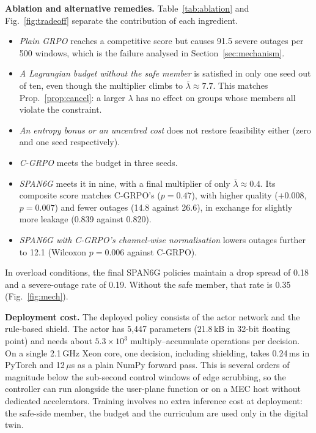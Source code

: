 \documentclass[conference]{IEEEtran}
\begin{document}
\textbf{Ablation and alternative remedies.} Table~\ref{tab:ablation} and Fig.~\ref{fig:tradeoff} separate the contribution of each ingredient.
\begin{itemize}
\item \emph{Plain GRPO} reaches a competitive score but causes 91.5 severe outages per 500 windows, which is the failure analysed in Section~\ref{sec:mechanism}.
\item \emph{A Lagrangian budget without the safe member} is satisfied in only one seed out of ten, even though the multiplier climbs to $\bar\lambda\approx7.7$. This matches Prop.~\ref{prop:cancel}: a larger $\lambda$ has no effect on groups whose members all violate the constraint.
\item \emph{An entropy bonus or an uncentred cost} does not restore feasibility either (zero and one seed respectively).
\item \emph{C-GRPO} meets the budget in three seeds.
\item \emph{SPAN6G} meets it in nine, with a final multiplier of only $\bar\lambda\approx0.4$. Its composite score matches C-GRPO's ($p=0.47$), with higher quality ($+0.008$, $p=0.007$) and fewer outages (14.8 against 26.6), in exchange for slightly more leakage (0.839 against 0.820).
\item \emph{SPAN6G with C-GRPO's channel-wise normalisation} lowers outages further to 12.1 (Wilcoxon $p=0.006$ against C-GRPO).
\end{itemize}
In overload conditions, the final SPAN6G policies maintain a drop spread of 0.18 and a severe-outage rate of 0.19. Without the safe member, that rate is 0.35 (Fig.~\ref{fig:mech}).

\textbf{Deployment cost.} The deployed policy consists of the actor network and the rule-based shield. The actor has 5{,}447 parameters (21.8\,kB in 32-bit floating point) and needs about $5.3\times10^{3}$ multiply--accumulate operations per decision. On a single 2.1\,GHz Xeon core, one decision, including shielding, takes 0.24\,ms in PyTorch and 12\,$\mu$s as a plain NumPy forward pass. This is several orders of magnitude below the sub-second control windows of edge scrubbing, so the controller can run alongside the user-plane function or on a MEC host without dedicated accelerators. Training involves no extra inference cost at deployment: the safe-side member, the budget and the curriculum are used only in the digital twin.
\end{document}
